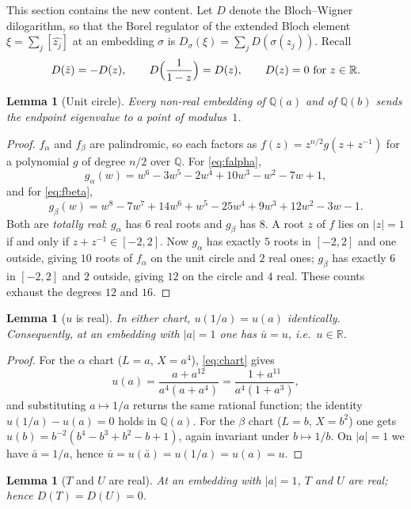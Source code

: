 \documentclass[11pt]{article}
\newtheorem{lemma}[theorem]{Lemma}
\theoremstyle{remark}
\newcommand{\RR}{\mathbb{R}}
\newcommand{\QQ}{\mathbb{Q}}
\begin{document}
This section contains the new content. Let $D$ denote the Bloch--Wigner
dilogarithm, so that the Borel regulator of the extended Bloch element
$\xi=\sum_j[\widehat{z_j}]$ at an embedding $\sigma$ is
$D_\sigma(\xi)=\sum_j D(\sigma(z_j))$. Recall
\begin{equation}\label{eq:Dsym}
D(\bar z)=-D(z),\qquad D\Bigl(\frac1{1-z}\Bigr)=D(z),\qquad
D(z)=0\ \text{for } z\in\RR .
\end{equation}

\begin{lemma}[Unit circle]\label{lem:circle}
Every non-real embedding of $\QQ(a)$ and of $\QQ(b)$ sends the endpoint
eigenvalue to a point of modulus~$1$.
\end{lemma}

\begin{proof}
$f_\alpha$ and $f_\beta$ are palindromic, so each factors as
$f(z)=z^{n/2}g(z+z^{-1})$ for a polynomial $g$ of degree $n/2$ over $\QQ$.
For \eqref{eq:falpha},
\[
g_\alpha(w)=w^6-3w^5-2w^4+10w^3-w^2-7w+1,
\]
and for \eqref{eq:fbeta},
\[
g_\beta(w)=w^8-7w^7+14w^6+w^5-25w^4+9w^3+12w^2-3w-1 .
\]
Both are \emph{totally real}: $g_\alpha$ has $6$ real roots and $g_\beta$ has
$8$. A root $z$ of $f$ lies on $|z|=1$ if and only if $z+z^{-1}\in[-2,2]$.
Now $g_\alpha$ has exactly $5$ roots in $[-2,2]$ and one outside, giving
$10$ roots of $f_\alpha$ on the unit circle and $2$ real ones; $g_\beta$ has
exactly $6$ in $[-2,2]$ and $2$ outside, giving $12$ on the circle and $4$ real.
These counts exhaust the degrees $12$ and $16$.
\end{proof}

\begin{lemma}[$u$ is real]\label{lem:ureal}
In either chart, $u(1/a)=u(a)$ identically. Consequently, at an embedding with
$|a|=1$ one has $\bar u=u$, i.e.\ $u\in\RR$.
\end{lemma}

\begin{proof}
For the $\alpha$ chart ($L=a$, $X=a^4$), \eqref{eq:chart} gives
\[
u(a)=\frac{a+a^{12}}{a^{4}(a+a^{4})}
=\frac{1+a^{11}}{a^{4}(1+a^{3})},
\]
and substituting $a\mapsto1/a$ returns the same rational function; the identity
$u(1/a)-u(a)=0$ holds in $\QQ(a)$. For the $\beta$ chart ($L=b$, $X=b^2$) one
gets $u(b)=b^{-2}(b^4-b^3+b^2-b+1)$, again invariant under $b\mapsto1/b$.
On $|a|=1$ we have $\bar a=1/a$, hence $\bar u=u(\bar a)=u(1/a)=u(a)=u$.
\end{proof}

\begin{lemma}[$T$ and $U$ are real]\label{lem:TU}
At an embedding with $|a|=1$, $T$ and $U$ are real; hence $D(T)=D(U)=0$.
\end{lemma}
\end{document}
